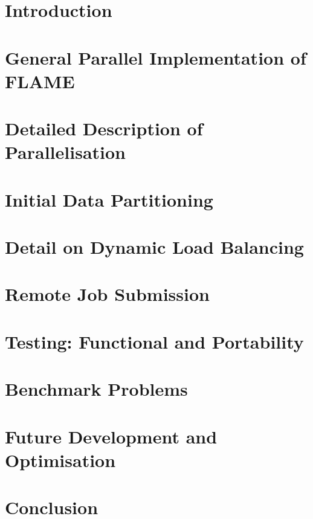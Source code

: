 \documentclass[a4paper,11pt]{article}
\begin{document}
\section{Introduction}	
\section{General Parallel Implementation of FLAME} 
\section{Detailed Description of Parallelisation} 
\section{Initial Data Partitioning} 
\section{Detail on Dynamic Load Balancing} 
\section{Remote Job Submission} 
\section{Testing: Functional and Portability} 
\section{Benchmark Problems} 
\section{Future Development and Optimisation} 
\section{Conclusion} 

\end{document}
